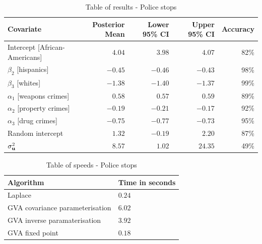 \begin{table}
	\begin{tabular}{|l|rrrr|}
		\hline
		Covariate                     & Posterior Mean & Lower 95\% CI & Upper 95\% CI & Accuracy \\
		\hline
		Intercept [African-Americans] & $4.04$          & $3.98$           & $4.07$          & 82\%   \\
		$\beta_2$ [hispanics]         & $-0.45$         & $-0.46$          & $-0.43$         & 98\%   \\
		$\beta_3$ [whites]            & $-1.38$         & $-1.40$          & $-1.37$         & 99\%   \\
		$\alpha_1$ [weapons crimes]   & $0.58$          & $0.57$           & $0.59$          & 89\%   \\
		$\alpha_2$ [property crimes]  & $-0.19$         & $-0.21$          & $-0.17$         & 92\%   \\
		$\alpha_3$ [drug crimes]      & $-0.75$        & $-0.77$          & $-0.73$         & 95\%   \\
		Random intercept              & $1.32$         & $-0.19$         & $2.20$         & 87\%   \\
		$\sigma^2_{{\bf u}}$              & $8.57$          & $1.02$           & $24.35$         & 49\%     \\
		\hline
	\end{tabular}
	\caption{Table of results - Police stops}
	\label{tab:application_police_stops}
\end{table}

\begin{table}
	\begin{tabular}{|ll|}
		\hline
		Algorithm & Time  in seconds \\
		\hline
		Laplace & $0.24$ \\
		GVA covariance parameterisation & $6.02$ \\
		GVA inverse paramaterisation & $3.92$ \\
		GVA fixed point & $0.18$ \\
		\hline
	\end{tabular}
	\caption{Table of speeds - Police stops}
	\label{tab:police_stop_speeds}
\end{table}

